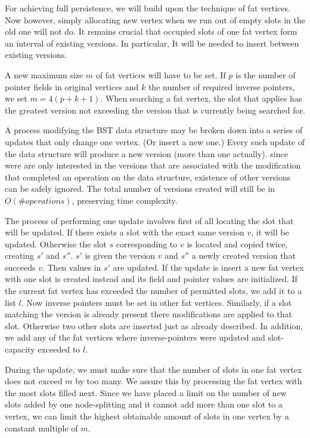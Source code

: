 For achieving full persistence, we will build upon the technique of fat vertices. Now however, simply allocating new vertex when we run out of empty slots in the old one will not do. It remains crucial that occupied slots of one fat vertex form an interval of existing versions. In particular, It will be needed to insert between existing versions.

A new maximum size $m$ of fat vertices will have to be set. If $p$ is the number of pointer fields in original vertices and $k$ the number of required inverse pointers, we set $m = 4(p+k+1)$.
When searching a fat vertex, the slot that applies has the greatest version not exceeding the version that is currently being searched for.


A process modifying the BST data structure may be broken down into a series of updates that only change one vertex. (Or insert a new one.)
Every such update of the data structure will produce a new version (more than one actually). since were are only interested in the versions that are associated with the modification that completed an operation on the data structure, existence of other versions can be safely ignored. The total number of versions created will still be in $O(\# operations)$, preserving time complexity.

The process of performing one update involves first of all locating the slot that will be updated. If there exists a slot with the exact same version $v$, it will be updated. Otherwise the slot $s$ corresponding to $v$ is located and copied twice, creating $s'$ and $s''$. $s'$ is given the version $v$ and $s''$ a newly created version that succeeds $v$. Then values in $s'$ are updated.
If the update is insert a new fat vertex with one slot is created instead and its field and pointer values are initialized.
If the current fat vertex has exceeded the number of permitted slots, we add it to a list $l$.
Now inverse pointers must be set in other fat vertices. Similarly, if a slot matching the version is already present there modifications are applied to that slot. Otherwise two other slots are inserted just as already described. In addition, we add any of the fat vertices where inverse-pointers were updated and slot-capacity exceeded to $l$.

During the update, we must make sure that the number of slots in one fat vertex does not exceed $m$ by too many. We assure this by processing the fat vertex with the most slots filled next. Since we have placed a limit on the number of new slots added by one node-splitting and it cannot add more than one slot to a vertex, we can limit the highest obtainable amount of slots in one vertex by a constant multiple of $m$.

